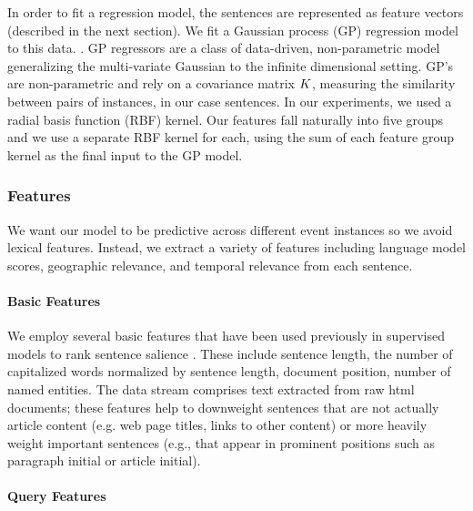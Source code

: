 In order to fit a regression model, the sentences are represented as feature
vectors (described in the next section).
We fit a Gaussian process (GP) regression model to this data.
\cite{rasmussen:gaussian-process-book}.  GP regressors are a
class of data-driven, non-parametric model generalizing the multi-variate
Gaussian to the infinite dimensional setting.  
GP's are non-parametric and rely on a covariance matrix $K$, measuring the similarity between pairs of instances, in our 
case sentences.  In our experiments, we used a radial basis 
function (RBF) kernel.  
Our features fall naturally into five groups and we use a separate RBF kernel
for each, using the sum of each feature group kernel as the final input
to the GP model.



\subsubsection{Features}
We want our model to be predictive across different event instances so we avoid lexical features.  Instead, we extract a variety of features including language model scores, geographic relevance, and temporal relevance from each sentence.  

\paragraph{Basic Features}

We employ several basic features that have been used previously in supervised models to rank sentence salience \cite{kupiec1995trainable,conroy2001using}. These include sentence length, the number of capitalized words normalized by sentence length, document position, number of named entities.  
The data stream comprises text extracted from raw html documents;
these features help to downweight sentences that are not actually article 
content (e.g. web page titles, links to other content) or
more heavily weight important sentences (e.g., that appear in
prominent positions such as paragraph initial or article initial).

\paragraph{Query Features}

